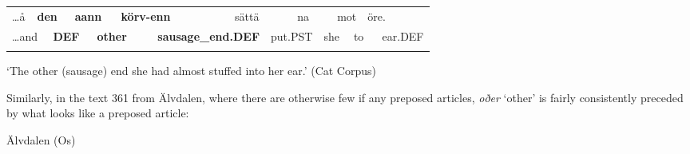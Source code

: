\begin{tabular}{llllllllllllllll}
\lsptoprule
…å & \multicolumn{2}{l}{{\bfseries den}

} & \multicolumn{2}{l}{{\bfseries aann}

} & \multicolumn{2}{l}{{\bfseries körv-enn}

} & \multicolumn{2}{l}{sättä

} & \multicolumn{2}{l}{na

} & \multicolumn{2}{l}{mot

} & \multicolumn{2}{l}{öre.

} & \\
\multicolumn{2}{l}{…and

} & \multicolumn{2}{l}{{\bfseries DEF}

} & \multicolumn{2}{l}{{\bfseries other}

} & \multicolumn{2}{l}{{\bfseries sausage\_end.DEF}

} & \multicolumn{2}{l}{put.PST

} & \multicolumn{2}{l}{she

} & \multicolumn{2}{l}{to

} & \multicolumn{2}{l}{ear.DEF

}\\
\lspbottomrule
\end{tabular}

\begin{styleTranslation}
‘The other (sausage) end she had almost stuffed into her ear.’ (Cat Corpus)

\end{styleTranslation}

\begin{styleBodyTextFirst}
Similarly, in the text 361 from Älvdalen, where there are otherwise few if any preposed articles, \textit{oðer} ‘other’ is fairly consistently preceded by what looks like a preposed article:

\end{styleBodyTextFirst}


\begin{listWWNumileveli}
\item {}

\begin{styleExample}
Älvdalen (Os)

\end{styleExample}

\end{listWWNumileveli}

